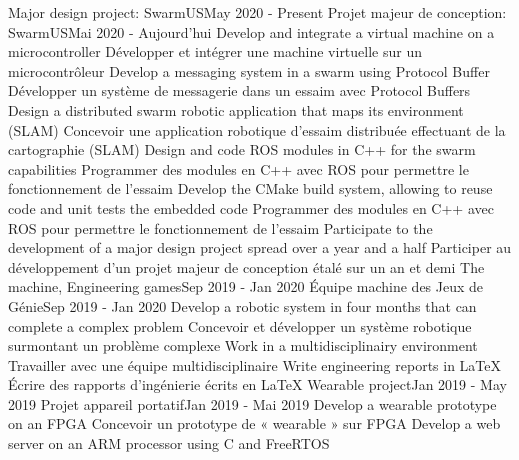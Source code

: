 \documentclass[letterpaper,11pt]{resume}
\begin{document}
    \resumeSubHeadingListStart
      \resumeProjectHeadingEnFr
          {Major design project: SwarmUS}{May 2020 - Present}
          {Projet majeur de conception: SwarmUS}{Mai 2020 - Aujourd'hui}
            \resumeItemEnFr
                {Develop and integrate a virtual machine on a microcontroller}
                {Développer et intégrer une machine virtuelle sur un microcontrôleur}
            \resumeItemEnFr
                {Develop a messaging system in a swarm using Protocol Buffer}
                {Développer un système de messagerie dans un essaim avec Protocol Buffers}
            \resumeItemEnFr
                {Design a distributed swarm robotic application that maps its environment (SLAM)}
                {Concevoir une application robotique d’essaim distribuée effectuant de la cartographie (SLAM)}
            \resumeItemEnFr
                {Design and code ROS modules in C++ for the swarm capabilities}
                {Programmer des modules en C++ avec ROS pour permettre le fonctionnement de l’essaim}
            \resumeItemEnFr
                {Develop the CMake build system, allowing to reuse code and unit tests the embedded code}
                {Programmer des modules en C++ avec ROS pour permettre le fonctionnement de l’essaim}
            \resumeItemEnFr
                {Participate to the development of a major design project spread over a year and a half}
                {Participer au développement d’un projet majeur de conception étalé sur un an et demi}
      \resumeProjectHeadingEnFr
          {The machine, Engineering games}{Sep 2019 - Jan 2020}
          {Équipe machine des Jeux de Génie}{Sep 2019 - Jan 2020}
            \resumeItemEnFr
                {Develop a robotic system in four months that can complete a complex problem}
                {Concevoir et développer un système robotique surmontant un problème complexe}
            \resumeItemEnFr
                {Work in a multidisciplinairy environment}
                {Travailler avec une équipe multidisciplinaire}
            \resumeItemEnFr
                {Write engineering reports in LaTeX}
                {Écrire des rapports d’ingénierie écrits en LaTeX}
      \resumeProjectHeadingEnFr
          {Wearable project}{Jan 2019 - May 2019}
          {Projet appareil portatif}{Jan 2019 - Mai 2019}
            \resumeItemEnFr
                {Develop a wearable prototype on an FPGA}
                {Concevoir un prototype de « wearable » sur FPGA}
            \resumeItemEnFr
                {Develop a web server on an ARM processor using C and FreeRTOS}
\end{document}

